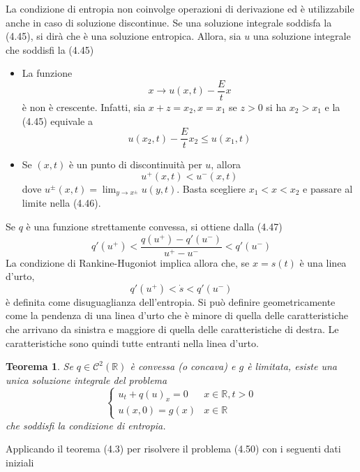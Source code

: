 \documentclass[a4paper,12pt, draft]{article}
\theoremstyle{break}
\newtheorem{theorem}{Teorema}[section]
\numberwithin{equation}{section}
\begin{document}
La condizione di entropia non coinvolge operazioni di derivazione ed è utilizzabile anche in caso di soluzione discontinue. Se una soluzione integrale soddisfa la (4.45), si dirà che è una soluzione entropica. Allora, sia \(u\) una soluzione integrale che soddisfi la (4.45)
\begin{itemize}
  \item La funzione 
  \[
  x \longrightarrow u(x,t) - \frac{E}{t}x  
  \]
  è non è crescente. Infatti, sia \(x+z=x_2, x = x_1\) se \(z > 0\) si ha \(x_2 > x_1\) e la (4.45) equivale a
  \begin{equation}
    u(x_2, t) -\frac{E}{t} x_2 \leq u(x_1, t)
  \end{equation}
  \item Se \((x,t)\) è un punto di discontinuità per \(u\), allora 
  \begin{equation}
    u^+(x,t) < u^- (x,t)
  \end{equation}
  dove \(u^{\pm} (x,t) = \lim_{y \to x^{\pm}}u(y,t)\). Basta scegliere \(x_1 < x < x_2\) e passare al limite nella (4.46). 
\end{itemize}
Se \(q\) è una funzione strettamente convessa, si ottiene dalla (4.47)
\begin{equation}
  q'(u^+) < \frac{q(u^+) - q'(u^-)}{u^+ - u^-} < q'(u^-)
\end{equation}
La condizione di Rankine-Hugoniot implica allora che, se \(x = s(t)\) è una linea d'urto,
\begin{equation}
  q'(u^+) < \dot{s} < q'(u^-)
\end{equation}
è definita come disuguaglianza dell'entropia. Si può definire geometricamente come la pendenza di una linea d'urto che è minore di quella delle caratteristiche che arrivano da sinistra e maggiore di quella delle caratteristiche di destra. Le caratteristiche sono quindi tutte entranti nella linea d'urto.
\begin{theorem}
  Se \(q \in \mathcal{C}^2(\mathbb{R})\) è convessa (o concava) e \(g\) è limitata, esiste una unica soluzione integrale del problema 
  \begin{equation}
    \begin{cases}
      u_t + q(u)_x = 0 & x \in \mathbb{R}, t > 0 \\
      u(x, 0) = g(x) & x \in \mathbb{R}
    \end{cases}
  \end{equation}
  che soddisfi la condizione di entropia.
\end{theorem}
Applicando il teorema (4.3) per risolvere il problema (4.50) con i seguenti dati iniziali
\end{document}
